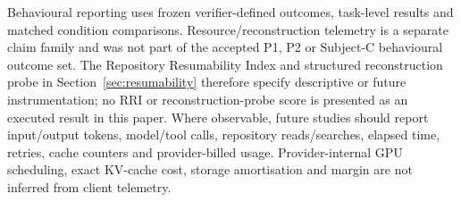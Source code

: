 Behavioural reporting uses frozen verifier-defined outcomes, task-level results and matched condition comparisons. Resource/reconstruction telemetry is a separate claim family and was not part of the accepted P1, P2 or Subject-C behavioural outcome set. The Repository Resumability Index and structured reconstruction probe in Section~\ref{sec:resumability} therefore specify descriptive or future instrumentation; no RRI or reconstruction-probe score is presented as an executed result in this paper. Where observable, future studies should report input/output tokens, model/tool calls, repository reads/searches, elapsed time, retries, cache counters and provider-billed usage. Provider-internal GPU scheduling, exact KV-cache cost, storage amortisation and margin are not inferred from client telemetry.
